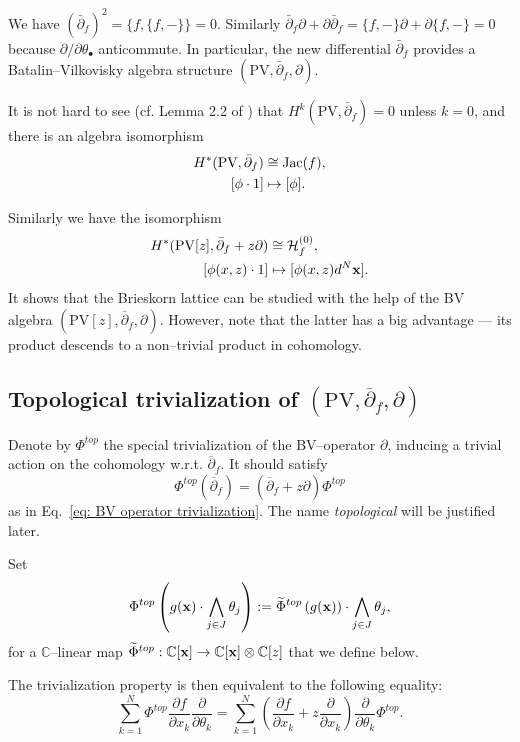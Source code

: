 \documentclass[12pt,a4paper]{amsart}
\newcommand{\CC}{{\mathbb{C}}}
\newcommand{\Jac}{\mathrm{Jac}}
\newcommand{\bx}{{\bf x}}
\def\H{{\mathcal H}}
\newcommand{\p}{{\partial}}
\newcommand{\<}{\left<}
\renewcommand{\>}{\right>}
\newcommand{\PV}{{\mathrm{PV}}}
\numberwithin{equation}{section}
\begin{document}
We have $(\bar \p_f)^2 = \lbrace f, \lbrace f, - \rbrace \rbrace = 0$.
Similarly $\bar\p_f \p + \p \bar\p_f = \lbrace f, - \rbrace \p + \p \lbrace f, - \rbrace= 0$ because $\p / \p \theta_\bullet$ anticommute. In particular, the new differential $\bar\p_f$ provides a Batalin--Vilkovisky algebra structure $(\PV, \bar \p_f, \p)$.

It is not hard to see (cf. Lemma 2.2 of \cite{LLS}) that  $H^k(\PV, \bar \p_f) = 0$ unless $k = 0$, and there is an algebra isomorphism
\begin{align}\label{eq: jac as cohomology}
H^\ast(\PV, \bar \p_f) & \cong \Jac(f),
\\
\notag
[\phi \cdot 1 ] & \mapsto [\phi].
\end{align}

Similarly we have the isomorphism
\begin{align}\label{eq: preBL as cohomology}
    H^\ast(\PV [z], \bar \p_f + z\p) & \cong \H_f^{(0)},
    \\
\notag
    [\phi(x,z) \cdot 1] & \mapsto [\phi(x,z) d^N\bx].
\end{align}
It shows that the Brieskorn lattice can be studied with the help of the BV algebra $(\PV[z], \overline{\p}_f, \p)$. However, note that the latter has a big advantage --- its product descends to a non--trivial product in cohomology.

\subsection{Topological trivialization of $(\PV,\overline \p_f, \p)$}\label{section: topological trivialization}
Denote by $\Phi^{top}$ the special trivialization of the BV--operator $\p$, inducing a trivial action on the cohomology w.r.t. $\overline \p_f$. It should satisfy
\[
    \Phi^{top} (\overline \p_f ) = (\overline \p_f + z \p) \Phi^{top}
\]
as in Eq.~\eqref{eq: BV operator trivialization}. The name \textit{topological} will be justified later.

Set
\begin{equation}
    \Phi^{top}\left(g(\bx) \cdot \bigwedge_{j \in J} \theta_{j} \right)
    := \widetilde \Phi^{top}\left(g(\bx) \right) \cdot \bigwedge_{j \in J} \theta_{j},
\end{equation}
for a $\CC$--linear map $\widetilde \Phi^{top}: \CC[\bx] \to \CC[\bx] \otimes \CC[z]$ that we define below.

The trivialization property is then equivalent to the following equality:
\[
    \sum_{k=1}^N \Phi^{top} \frac{\p f}{\p x_k} \frac{\p}{\p \theta_k} =
    \sum_{k=1}^N \left(\frac{\p f}{\p x_k} + z \frac{\p}{\p x_k} \right) \frac{\p}{\p \theta_k} \Phi^{top}.
\]
\end{document}
